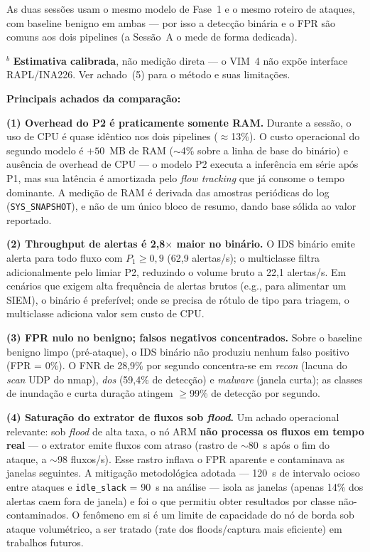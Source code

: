 \documentclass[12pt]{article}
\begin{document}
\noindent As duas sessões usam o mesmo modelo de Fase~1 e o mesmo roteiro de
ataques, com baseline benigno em ambas — por isso a detecção binária e o FPR são
comuns aos dois pipelines (a Sessão~A o mede de forma dedicada).

\noindent$^{b}$ \textbf{Estimativa calibrada}, não medição direta — o VIM~4 não
expõe interface RAPL/INA226. Ver achado~(5) para o método e suas limitações.

\textbf{Principais achados da comparação:}

\textbf{(1) Overhead do P2 é praticamente somente RAM.}
Durante a sessão, o uso de CPU é quase idêntico nos dois pipelines
($\approx$13\%). O custo operacional do segundo modelo é $+50$~MB de RAM
($\sim$4\% sobre a linha de base do binário) e ausência de overhead de CPU — o
modelo P2 executa a inferência em série após P1, mas sua latência é amortizada
pelo \textit{flow tracking} que já consome o tempo dominante. A medição de RAM é
derivada das amostras periódicas do log (\texttt{SYS\_SNAPSHOT}), e não de um
único bloco de resumo, dando base sólida ao valor reportado.

\textbf{(2) Throughput de alertas é 2,8$\times$ maior no binário.}
O IDS binário emite alerta para todo fluxo com $P_1 \geq 0{,}9$ (62,9 alertas/s);
o multiclasse filtra adicionalmente pelo limiar P2, reduzindo o volume bruto a
22,1 alertas/s. Em cenários que exigem alta frequência de alertas brutos
(e.g., para alimentar um SIEM), o binário é preferível; onde se precisa de
rótulo de tipo para triagem, o multiclasse adiciona valor sem custo de CPU.

\textbf{(3) FPR nulo no benigno; falsos negativos concentrados.}
Sobre o baseline benigno limpo (pré-ataque), o IDS binário não produziu nenhum
falso positivo (FPR = 0\%). O FNR de 28,9\% por segundo concentra-se em
\textit{recon} (lacuna do \textit{scan} UDP do nmap), \textit{dos} (59,4\% de
detecção) e \textit{malware} (janela curta); as classes de inundação e curta
duração atingem $\geq$99\% de detecção por segundo.

\textbf{(4) Saturação do extrator de fluxos sob \textit{flood}.}
Um achado operacional relevante: sob \textit{flood} de alta taxa, o nó ARM
\textbf{não processa os fluxos em tempo real} — o extrator emite fluxos com
atraso (rastro de $\sim$80~s após o fim do ataque, a $\sim$98 fluxos/s). Esse
rastro inflava o FPR aparente e contaminava as janelas seguintes. A mitigação
metodológica adotada — 120~s de intervalo ocioso entre ataques e
\texttt{idle\_slack} = 90~s na análise — isola as janelas (apenas 14\% dos
alertas caem fora de janela) e foi o que permitiu obter resultados por classe
não-contaminados. O fenômeno em si é um limite de capacidade do nó de borda sob
ataque volumétrico, a ser tratado (rate dos floods/captura mais eficiente) em
trabalhos futuros.
\end{document}
